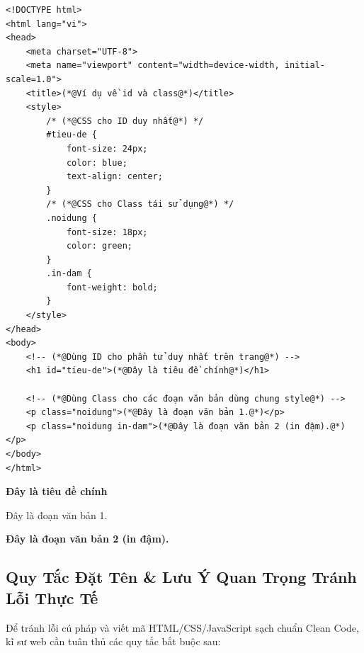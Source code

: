 \documentclass[11pt,oneside]{book}
\begin{document}
\begin{codeWindow}
\begin{lstlisting}[language=HTML5]
<!DOCTYPE html>
<html lang="vi">
<head>
    <meta charset="UTF-8">
    <meta name="viewport" content="width=device-width, initial-scale=1.0">
    <title>(*@Ví dụ về id và class@*)</title>
    <style>
        /* (*@CSS cho ID duy nhất@*) */
        #tieu-de {
            font-size: 24px;
            color: blue;
            text-align: center;
        }
        /* (*@CSS cho Class tái sử dụng@*) */
        .noidung {
            font-size: 18px;
            color: green;
        }
        .in-dam {
            font-weight: bold;
        }
    </style>
</head>
<body>
    <!-- (*@Dùng ID cho phần tử duy nhất trên trang@*) -->
    <h1 id="tieu-de">(*@Đây là tiêu đề chính@*)</h1>

    <!-- (*@Dùng Class cho các đoạn văn bản dùng chung style@*) -->
    <p class="noidung">(*@Đây là đoạn văn bản 1.@*)</p>
    <p class="noidung in-dam">(*@Đây là đoạn văn bản 2 (in đậm).@*)</p>
</body>
</html>
\end{lstlisting}
\end{codeWindow}

\begin{browserWindow}
\centering\sffamily
{\Large\bfseries\color{blue} Đây là tiêu đề chính} \par\vspace{6pt}
{\small\color{green} Đây là đoạn văn bản 1.} \par\vspace{4pt}
{\small\bfseries\color{green} Đây là đoạn văn bản 2 (in đậm).}
\end{browserWindow}

\subsection{Quy Tắc Đặt Tên \& Lưu Ý Quan Trọng Tránh Lỗi Thực Tế}

Để tránh lỗi cú pháp và viết mã HTML/CSS/JavaScript sạch chuẩn Clean Code, kĩ sư web cần tuân thủ các quy tắc bắt buộc sau:
\end{document}

